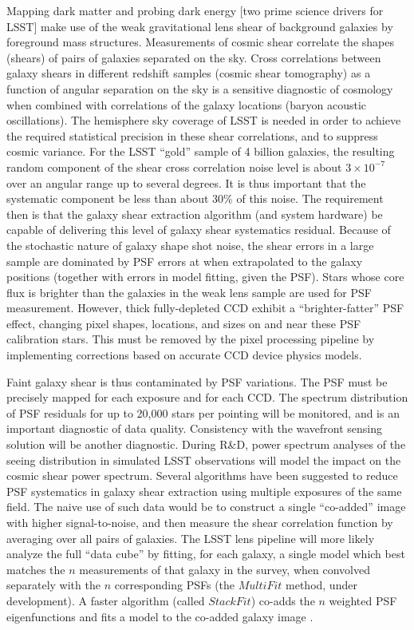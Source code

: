 \documentclass[SE,toc,lsstdraft]{lsstdoc}
\newcommand{\oldtext}[1]{{\color{red} #1}}
\newcommand{\newtext}[1]{{\color{blue} #1}}
\begin{document}
Mapping dark matter and probing dark energy [two prime science drivers for LSST] make use of the weak gravitational lens shear of background galaxies by foreground mass structures. Measurements of cosmic shear correlate the shapes (shears) of pairs of galaxies separated on the sky.  Cross correlations between galaxy shears in different redshift samples (cosmic shear tomography) \newtext{as a function of angular separation on the sky} is a sensitive diagnostic of cosmology when combined with correlations of the galaxy locations (baryon acoustic oscillations). The hemisphere sky coverage of LSST is needed in order to achieve the required statistical precision in these shear correlations, and to suppress cosmic variance.  For the LSST ``gold'' sample of 4 billion galaxies, the resulting random component of the shear cross correlation noise level is about $3\times10^{-7}$ over an angular range up to several degrees.  It is thus important that the systematic component be less than about 30\% of this noise.  The requirement then is that the galaxy shear extraction algorithm (and system hardware) be capable of delivering this level of galaxy shear systematics residual.  Because of the stochastic nature of galaxy shape shot noise, the shear errors in a large sample are dominated by PSF errors \oldtext{at} \newtext{when extrapolated to} the galaxy positions (together with errors in model fitting, given the PSF).
\newtext{
Stars whose core flux is brighter than the galaxies in the weak lens sample are used for PSF measurement.
However, thick fully-depleted CCD exhibit a ``brighter-fatter'' PSF effect, changing pixel shapes, locations, and sizes on and near these PSF calibration stars.
This must be removed by the pixel processing pipeline by implementing corrections based on accurate CCD device physics models.
}

Faint galaxy shear is thus contaminated by PSF variations. The PSF must be precisely mapped for each exposure and for each CCD. The \oldtext{spectrum} \newtext{distribution} of PSF residuals for up to 20,000 stars per pointing will be monitored, and is an important diagnostic of data quality. Consistency with the wavefront sensing solution will be another diagnostic.
\oldtext{During R\&D, power spectrum analyses of the seeing distribution in simulated LSST observations will model the impact on the cosmic shear power spectrum.}
Several algorithms have been suggested to reduce PSF systematics in galaxy shear extraction using multiple exposures of the same field.  The naive use of such data would be to construct a single ``co-added'' image with higher signal-to-noise, and then measure the shear correlation function by averaging over all pairs of galaxies.  The LSST lens pipeline will more likely analyze the full ``data cube'' by fitting, for each galaxy, a single model which best matches the $n$ measurements of that galaxy in the survey, when convolved separately with the $n$ corresponding PSFs (the $MultiFit$ method, under development). A faster algorithm (called $StackFit$) co-adds the $n$ weighted PSF eigenfunctions and fits a model to the co-added galaxy image \citep{2011PASP..123..596J}.
\end{document}

